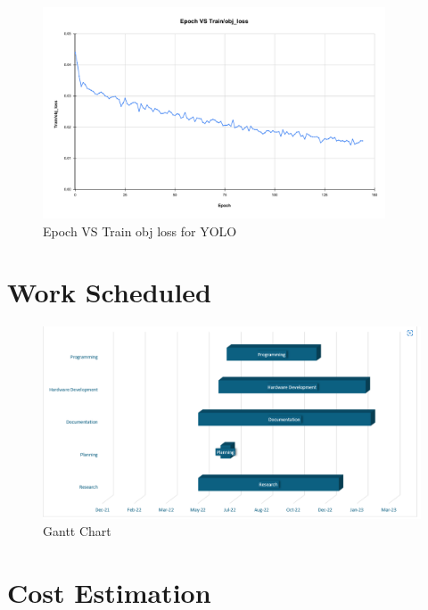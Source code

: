 \begin{enumerate}
\begin{figure}[H]
\begin{center}
	\includegraphics[width = 4in]{images/Epoch VS Train_obj_loss.pdf}
	 \caption{Epoch VS Train obj loss for YOLO} %
	\label{figSample1} %
\end{center}
\end{figure}
\end{enumerate}


\section{Work Scheduled}

\begin{figure}[H] %
\begin{center}
	\includegraphics[width = 7in]{images/ganttchart.png}
	\caption{Gantt Chart} %
	\label{figSample1} %
\end{center}
\end{figure}

\section{Cost Estimation}


